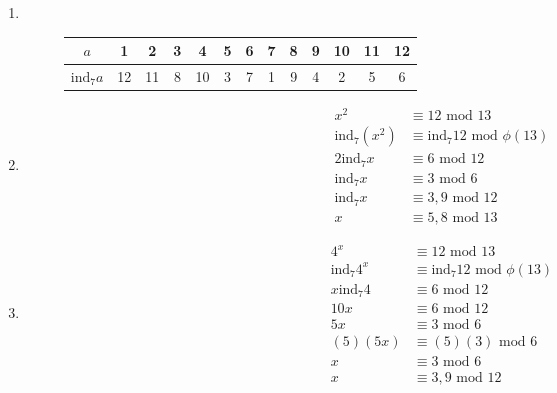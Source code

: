 \documentclass[class=article, crop=false]{standalone}
\def\ind{{\text{ind}}}
\begin{document}
\subsubsection{}
\begin{enumerate}
  \item $ $
    \begin{figure}[h]
    \centering
    \begin{tabular}{|c|c|c|c|c|c|c|c|c|c|c|c|c|}
      \hline
      $a$ & 1 & 2 & 3 & 4 & 5 & 6 & 7 & 8 & 9 & 10 & 11 & 12 \\
      \hline
      $\ind_7 a$ & 12 & 11 & 8 & 10 & 3 & 7 & 1 & 9 & 4 & 2 & 5 & 6 \\
      \hline
    \end{tabular}
    \end{figure}

  \item
    \begin{align*}
      x^{2} &\equiv 12\mbox{ mod } 13 \\
      \ind_7 (x^2) &\equiv \ind_7 12 \mbox{ mod } \phi(13) \\
      2\ind_7 x &\equiv 6 \mbox{ mod } 12 \\
      \ind_7 x &\equiv 3 \mbox{ mod } 6 \\
      \ind_7 x &\equiv 3,9 \mbox{ mod } 12 \\
      x &\equiv 5,8 \mbox{ mod } 13
    \end{align*}

  \item
    \begin{align*}
      4^x &\equiv 12\mbox{ mod } 13 \\
      \ind_7 4^x &\equiv \ind_7 12 \mbox{ mod } \phi(13) \\
      x\ind_7 4 &\equiv 6 \mbox{ mod } 12 \\
      10x &\equiv 6 \mbox{ mod } 12 \\
      5x &\equiv 3 \mbox{ mod } 6 \\
      (5)(5x) &\equiv (5)(3) \mbox{ mod } 6\\
      x &\equiv 3 \mbox{ mod } 6 \\
      x &\equiv 3, 9 \mbox{ mod } 12
    \end{align*}

  \end{enumerate}
\end{document}

